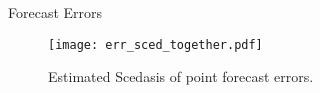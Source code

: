 \documentclass[notes]{beamer}
\begin{document}

\begin{frame}{Forecast Errors}
\begin{figure}
\centering
\texttt{[image: err\_sced\_together.pdf]}
\caption{Estimated Scedasis of point forecast errors.}
\label{fig:err_sced} 
\end{figure}
\end{frame}

\end{document}
